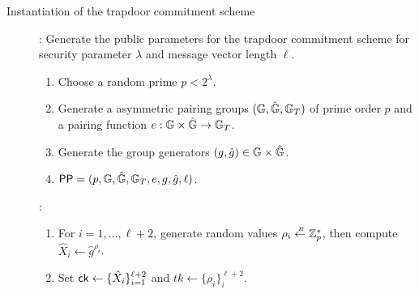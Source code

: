 \begin{section}{Instantiation of the trapdoor commitment scheme} \label{trap-com}
  \begin{description}
  \item[]: Generate the public parameters for the trapdoor commitment scheme for security parameter $\lambda$ and message vector length $\ell$. 
    \begin{enumerate}
    \item Choose a random prime $p< 2^{\lambda}$.
    \item Generate a asymmetric pairing groups $(\mathbb{G}, \hat{\mathbb{G}}, \mathbb{G}_T)$ of prime order $p$ and a pairing function $e : \mathbb{G} \times \hat{\mathbb{G}} \to \mathbb{G}_T$.
    \item Generate the group generators $(g, \hat{g}) \in \mathbb{G} \times \hat{\mathbb{G}}$.	
    \item $\mathsf{PP} = (p, \mathbb{G}, \hat{\mathbb{G}}, \mathbb{G}_T, e, g, \hat{g},\ell)$.
    \end{enumerate}

  \item[]:
    \begin{enumerate}
    \item For $i = 1, \dots, \ell+2$, generate random values $\rho_i \stackrel{{\scriptscriptstyle \mkern4mu R}}{\gets} \mathbb{Z}_p^*$, then compute $\hat{X}_i \gets \hat{g}^{\rho_i}$.
    \item Set $\mathsf{ck} \gets \{\hat{X}_i\}_{i = 1}^{\ell+2}$ and $tk \gets \{\rho_i\}_i^{\ell+2}$.
    \end{enumerate}



\end{description}
\end{section}
